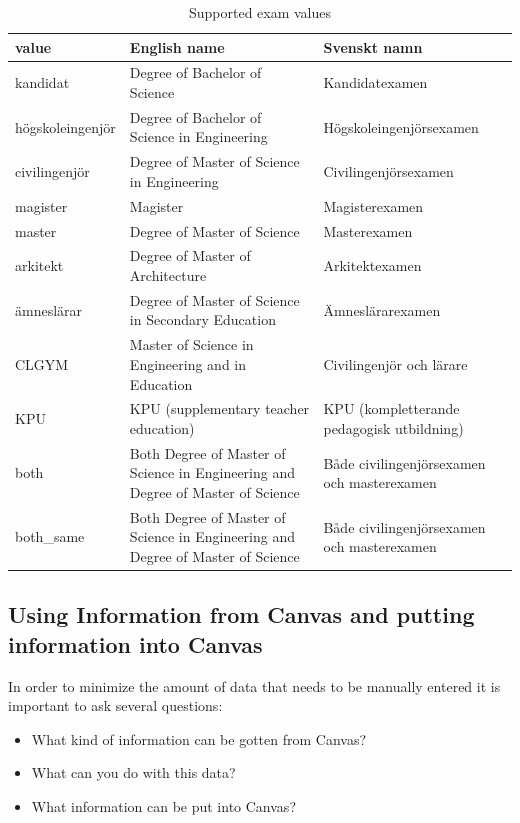 \begin{table}[!ht]
    \caption{Supported exam values}
    \label{tab:examValues}
    \begin{tabular}{L{3cm}|L{4.5cm}|L{4.5cm}}
      \textbf{value} & \textbf{English name} & \textbf{Svenskt namn}\\
      \hline
kandidat & Degree of Bachelor of Science & Kandidatexamen\\
högskoleingenjör & Degree of Bachelor of Science in Engineering & Högskoleingenjörsexamen\\
civilingenjör & Degree of Master of Science in Engineering & Civilingenjörsexamen\\
magister & Magister & Magisterexamen\\
master & Degree of Master of Science & Masterexamen\\
arkitekt & Degree of Master of Architecture & Arkitektexamen\\
ämneslärar & Degree of Master of Science in Secondary Education & Ämneslärarexamen\\
CLGYM & Master of Science in Engineering and in Education & Civilingenjör och lärare\\
KPU & KPU (supplementary teacher education) & KPU (kompletterande pedagogisk utbildning)\\
both & Both Degree of Master of Science in Engineering and Degree of Master of Science &
        Både civilingenjörsexamen och masterexamen\\
both\_same & Both Degree of Master of Science in Engineering and Degree of Master of Science & Både civilingenjörsexamen och masterexamen\\
\hline
   \end{tabular}
\end{table}
\FloatBarrier


\subsection{Using Information from Canvas and putting information into Canvas}
In order to minimize the amount of data that needs to be manually entered it is important to ask several questions:
\begin{itemize}
    \item What kind of information can be gotten from Canvas?
    \item What can you do with this data?
    \item What information can be put into Canvas?
\end{itemize}

